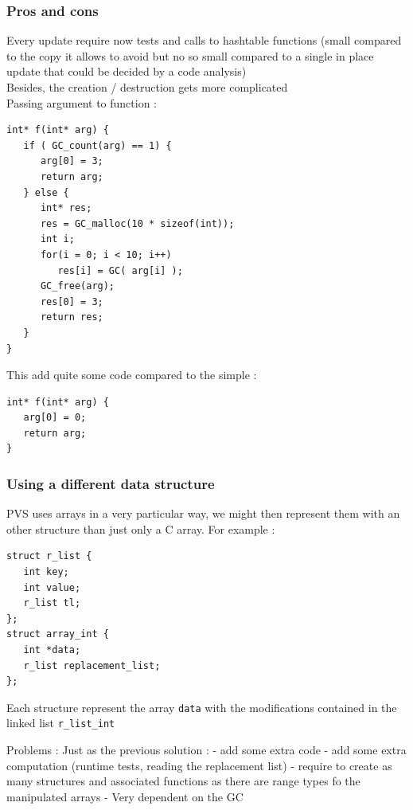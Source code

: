 \documentclass[12pt,a4paper,titlepage]{article}
\newcommand{\cl}[1]{\texttt{#1}}
\begin{document}
\subsubsection{Pros and cons}


Every update require now tests and calls to hashtable functions (small compared to the copy it allows to avoid but no so small compared to a single in place update that could be decided by a code analysis)\\

Besides, the creation / destruction gets more complicated\\

Passing argument to function :
\begin{lstlisting}
int* f(int* arg) {
   if ( GC_count(arg) == 1) {
      arg[0] = 3;
      return arg;
   } else {
      int* res;
      res = GC_malloc(10 * sizeof(int));
      int i;
      for(i = 0; i < 10; i++)
         res[i] = GC( arg[i] );
      GC_free(arg);
      res[0] = 3;
      return res;
   }
}
\end{lstlisting}

This add quite some code compared to the simple :

\begin{lstlisting}
int* f(int* arg) {
   arg[0] = 0;
   return arg;
}
\end{lstlisting}




\subsubsection{Using a different data structure}

PVS uses arrays in a very particular way, we might then represent them with an other structure than just only a C array.
For example :

\begin{lstlisting}
struct r_list {
   int key;
   int value;
   r_list tl;
};
struct array_int {
   int *data;
   r_list replacement_list;
};
\end{lstlisting}

Each structure represent the array \cl{data} with the modifications contained in the linked list \cl{r\_list\_int}

Problems : Just as the previous solution :
- add some extra code
- add some extra computation (runtime tests, reading the replacement list)
- require to create as many structures and associated functions as there are range types fo the manipulated arrays
- Very dependent on the GC
\end{document}
